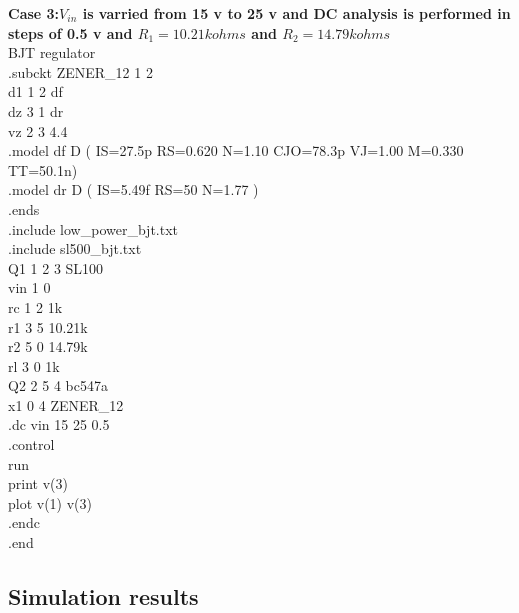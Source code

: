 \documentclass[12pt]{article}
\begin{document}
\newpage
\textbf{Case 3:\(V_{in}\) is varried from 15 v to 25 v and DC analysis is performed in steps of 0.5 v and \(R_{1}=10.21 k ohms\) and \(R_{2}=14.79 k ohms\) \\}
BJT regulator\\
.subckt ZENER\_12 1 2\\
d1 1 2 df\\
dz 3 1 dr\\
vz 2 3 4.4\\
.model df D ( IS=27.5p RS=0.620 N=1.10 CJO=78.3p VJ=1.00 M=0.330 TT=50.1n)\\
.model dr D ( IS=5.49f RS=50 N=1.77 )\\
.ends\\
.include low\_power\_bjt.txt\\
.include sl500\_bjt.txt\\
Q1 1 2 3 SL100	\\
vin 1 0 \\
rc 1 2 1k\\
r1 3 5 10.21k\\
r2 5 0 14.79k\\
rl 3 0 1k\\
Q2 2 5 4 bc547a\\
x1 0 4 ZENER\_12\\
.dc vin 15 25 0.5\\ 
.control\\
run\\
print v(3)\\
plot v(1) v(3)\\
.endc \\
.end\\

\newpage


\subsection{Simulation results}
\end{document}
